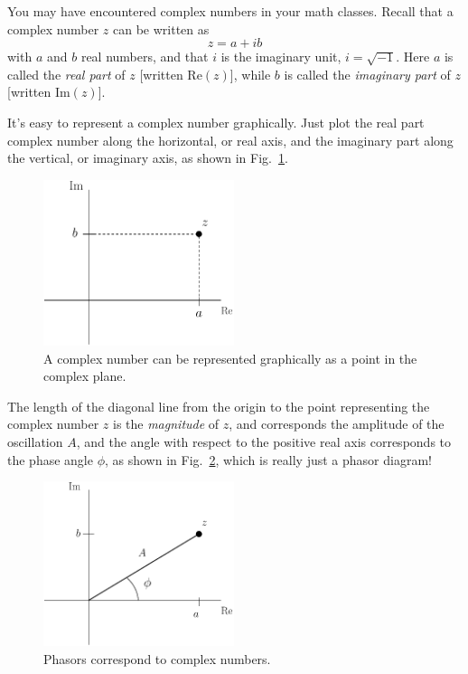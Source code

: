 You may have encountered complex numbers in your math classes.
Recall that a complex number $z$ can be written as
\begin{equation}
z = a + ib
\end{equation}
with $a$ and $b$ real numbers, and that $i$ is the imaginary unit, 
$i = \sqrt{-1}$.  Here $a$ is called the \textit{real part} of  $z$ 
[written $\mbox{Re}(z)$], while $b$ is called the \textit{imaginary part} 
of $z$ [written $\mbox{Im}(z)$].

It's easy to represent a complex number  graphically.  Just plot the 
real part complex number along the horizontal, or real axis, 
and the imaginary part along the vertical, or imaginary axis,
as shown in Fig.~\ref{fig:complexPlane}.

\begin{figure}\begin{center}
\includegraphics[width=2.2in]{phasors/complex_plane}  
\caption{\label{fig:complexPlane} A complex number can be represented
graphically as a point in the complex plane.}
\end{center}
\end{figure}

The length of the diagonal line from the origin to the point representing
the complex number $z$ is the \textit{magnitude} of $z$, and corresponds
the amplitude of the oscillation $A$, and the angle with respect to the 
positive real axis corresponds to the phase angle $\phi$, as shown in 
Fig.~\ref{fig:complexPhasor}, which is really just a phasor diagram!
\begin{figure}[b]
\begin{center}
\includegraphics[width=2.2in]{phasors/complex_phasor}  
\caption{\label{fig:complexPhasor}Phasors correspond to complex numbers.}
\end{center}
\end{figure}

